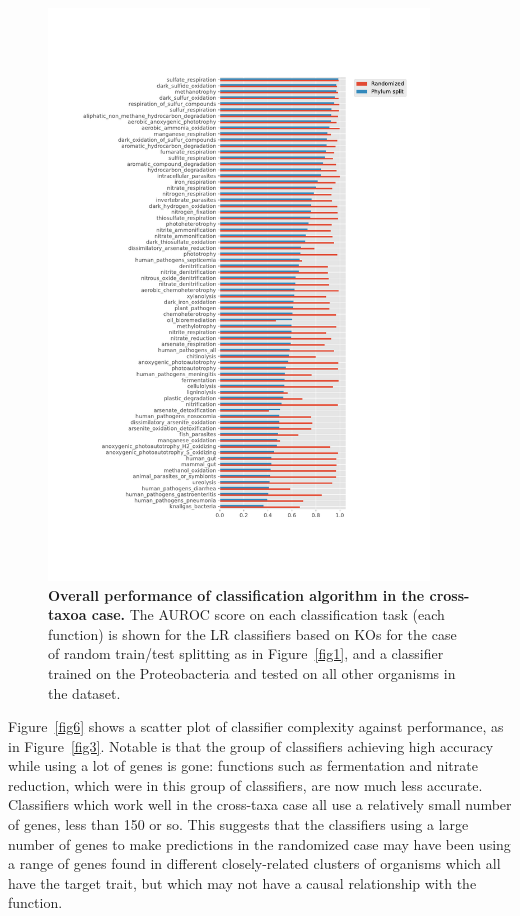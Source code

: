 \documentclass[10pt,letterpaper]{article}
\begin{document}
\begin{figure}[!h]
\includegraphics[width=0.9\textwidth]{fig5b}
\caption{{\bf Overall performance of classification algorithm in the cross-taxoa case.}
The AUROC score on each classification task (each function) is shown for the LR classifiers based on KOs for the case of random train/test splitting as in Figure~\ref{fig1}, and a classifier trained on the Proteobacteria and tested on all other organisms in the dataset.}
\label{fig5}
\end{figure}

Figure~\ref{fig6} shows a scatter plot of classifier complexity against performance, as in Figure~\ref{fig3}. Notable is that the group of classifiers achieving high accuracy while using a lot of genes is gone: functions such as fermentation and nitrate reduction, which were in this group of classifiers, are now much less accurate. Classifiers which work well in the cross-taxa case all use a relatively small number of genes, less than 150 or so. This suggests that the classifiers using a large number of genes to make predictions in the randomized case may have been using a range of genes found in different closely-related clusters of organisms which all have the target trait, but which may not have a causal relationship with the function.
\end{document}
